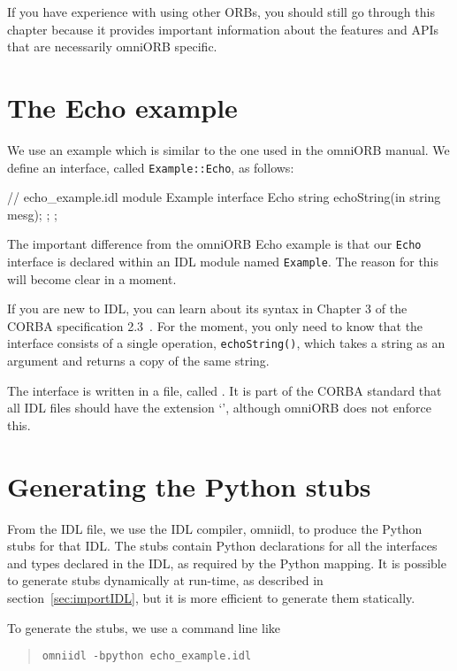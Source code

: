 \documentclass[11pt,twoside,a4paper]{book}
\newcommand{\intf}[1]{\texttt{#1}}
\newcommand{\module}[1]{\texttt{#1}}
\newcommand{\op}[1]{\texttt{#1()}}
\newcommand{\cmdline}[1]{\texttt{#1}}
\newcommand{\file}{\begingroup \urlstyle{tt}\Url}
\begin{document}
If you have experience with using other ORBs, you should still go
through this chapter because it provides important information about
the features and APIs that are necessarily omniORB specific.


\section{The Echo example}

We use an example which is similar to the one used in the omniORB
manual. We define an interface, called \intf{Example::Echo}, as
follows:

\begin{idllisting}
// echo_example.idl
module Example {
  interface Echo {
    string echoString(in string mesg);
  };
};
\end{idllisting}

The important difference from the omniORB Echo example is that our
\intf{Echo} interface is declared within an IDL module named
\module{Example}. The reason for this will become clear in a moment.

If you are new to IDL, you can learn about its syntax in Chapter 3 of
the CORBA specification 2.3~\cite{corba23-spec}. For the moment, you
only need to know that the interface consists of a single operation,
\op{echoString}, which takes a string as an argument and returns a
copy of the same string.

The interface is written in a file, called \file{echo_example.idl}. It
is part of the CORBA standard that all IDL files should have the
extension `\file{.idl}', although omniORB does not enforce this.


\section{Generating the Python stubs}
\label{sec:generatingStubs}

From the IDL file, we use the IDL compiler, omniidl, to produce the
Python stubs for that IDL. The stubs contain Python declarations for
all the interfaces and types declared in the IDL, as required by the
Python mapping. It is possible to generate stubs dynamically at
run-time, as described in section~\ref{sec:importIDL}, but it is more
efficient to generate them statically.

To generate the stubs, we use a command line like

\begin{quote}
\cmdline{omniidl -bpython echo\_example.idl}
\end{quote}
\end{document}
